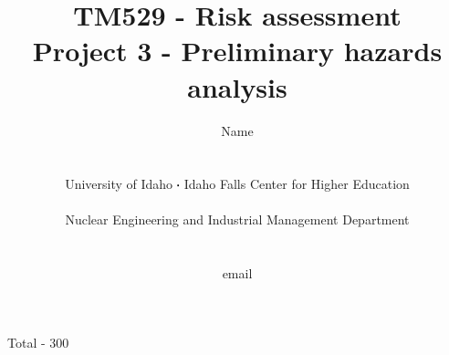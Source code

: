 \documentclass[11pt,a4paper]{article}
\newcommand*\sq{\mathbin{\vcenter{\hbox{\rule{.3ex}{.3ex}}}}} %
\begin{document}
\begin{titlepage}
    \title{
        TM529 - Risk assessment\\
        Project 3 - Preliminary hazards analysis\\
    }
    \author{
        Name
        \\ \\ \\
        University of Idaho $\sq$ Idaho Falls Center for Higher Education
        \\ \\
        Nuclear Engineering and Industrial Management Department
        \\ \\ \\
        email 
    }
\clearpage %
\maketitle
\vspace*{\fill}
\begin{flushright}{
        Total - 300
}
\end{flushright}
\thispagestyle{empty} %
\end{titlepage}
\end{document}
